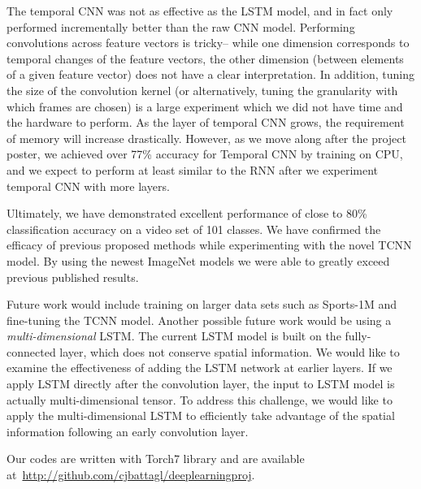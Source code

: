 The temporal CNN was not as effective as the LSTM model, and in fact only performed incrementally better than the raw CNN model. Performing convolutions across feature vectors is tricky-- while one dimension corresponds to temporal changes of the feature vectors, the other dimension (between elements of a given feature vector) does not have a clear interpretation. In addition, tuning the size of the convolution kernel (or alternatively, tuning the granularity with which frames are chosen) is a large experiment which we did not have time and the hardware to perform. As the layer of temporal CNN grows, the requirement of memory will increase drastically. However, as we move along after the project poster, we achieved over 77\% accuracy for Temporal CNN by training on CPU, and we expect to perform at least similar to the RNN after we experiment temporal CNN with more layers. 


Ultimately, we have demonstrated excellent performance of close to 80\% classification accuracy on a video set of 101 classes. We have confirmed the efficacy of previous proposed methods while experimenting with the novel TCNN model. By using the newest ImageNet models we were able to greatly exceed previous published results. 

Future work would include training on larger data sets such as Sports-1M and fine-tuning the TCNN model. Another possible future work would be using a \emph{multi-dimensional} LSTM. The current LSTM model is built on the fully-connected layer, which does not conserve spatial information. We would like to examine the effectiveness of adding the LSTM network at earlier layers. If we apply LSTM directly after the convolution layer, the input to LSTM model is actually multi-dimensional tensor. To address this challenge, we would like to apply the multi-dimensional LSTM
\cite{byeon2015scene} to efficiently take advantage of the spatial information following an early convolution layer. 

Our codes are written with Torch7 library and are available at~\url{http://github.com/cjbattagl/deeplearningproj}.
